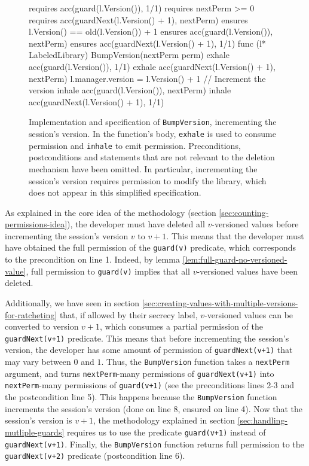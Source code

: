 \begin{figure}
    \begin{gobra}
requires acc(guard(l.Version()), 1/1)
requires nextPerm >= 0
requires acc(guardNext(l.Version() + 1), nextPerm)
ensures  l.Version() == old(l.Version()) + 1
ensures  acc(guard(l.Version()), nextPerm)
ensures  acc(guardNext(l.Version() + 1), 1/1)
func (l* LabeledLibrary) BumpVersion(nextPerm perm) {
    exhale acc(guard(l.Version()), 1/1)
    exhale acc(guardNext(l.Version() + 1), nextPerm)
    l.manager.version = l.Version() + 1 // Increment the version
    inhale acc(guard(l.Version()), nextPerm)
    inhale acc(guardNext(l.Version() + 1), 1/1)
}
    \end{gobra}
    \caption{Implementation and specification of \texttt{BumpVersion}, incrementing the session's version.
    In the function's body, \texttt{exhale} is used to consume permission and \texttt{inhale} to emit permission.
    Preconditions, postconditions and statements that are not relevant to the deletion mechanism have been omitted.
    In particular, incrementing the session's version requires permission to modify the library, which does not appear in this simplified specification.}
    \label{lst:bump-version}
\end{figure}

As explained in the core idea of the methodology (section \ref{sec:counting-permissions-idea}), the developer must have deleted all $v$-versioned values before incrementing the session's version $v$ to $v+1$. This means that the developer must have obtained the full permission of the \texttt{guard(v)} predicate, which corresponds to the precondition on line 1.
Indeed, by lemma \ref{lem:full-guard-no-versioned-value}, full permission to \texttt{guard(v)} implies that all $v$-versioned values have been deleted.

Additionally, we have seen in section \ref{sec:creating-values-with-multiple-versions-for-ratcheting} that, if allowed by their secrecy label, $v$-versioned values can be converted to version $v+1$, which consumes a partial permission of the \texttt{guardNext(v+1)} predicate.
This means that before incrementing the session's version, the developer has some amount of permission of \texttt{guardNext(v+1)} that may vary between $0$ and $1$.
Thus, the \texttt{BumpVersion} function takes a \texttt{nextPerm} argument, and turns \texttt{nextPerm}-many permissions of \texttt{guardNext(v+1)} into \texttt{nextPerm}-many permissions of \texttt{guard(v+1)} (see the preconditions lines 2-3 and the postcondition line 5).
This happens because the \texttt{BumpVersion} function increments the session's version (done on line 8, ensured on line 4).
Now that the session's version is $v+1$, the methodology explained in section \ref{sec:handling-mutliple-guards} requires us to use the predicate \texttt{guard(v+1)} instead of \texttt{guardNext(v+1)}.
Finally, the \texttt{BumpVersion} function returns full permission to the \texttt{guardNext(v+2)} predicate (postcondition line 6).


